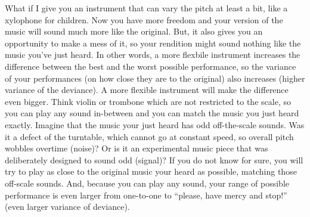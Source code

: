 \documentclass[
]{book}
\begin{document}
What if I give you an instrument that can vary the pitch at least a bit, like a xylophone for children. Now you have more freedom and your version of the music will sound much more like the original. But, it also gives you an opportunity to make a mess of it, so your rendition might sound nothing like the music you've just heard. In other words, a more flexbile instrument increases the difference between the best and the worst possible performance, so the variance of your performances (on how close they are to the original) also increases (higher variance of the deviance). A more flexible instrument will make the difference even bigger. Think violin or trombone which are not restricted to the scale, so you can play any sound in-between and you can match the music you just heard exactly. Imagine that the music your just heard has odd off-the-scale sounds. Was it a defect of the turntable, which cannot go at constant speed, so overall pitch wobbles overtime (noise)? Or is it an experimental music piece that was deliberately designed to sound odd (signal)? If you do not know for sure, you will try to play as close to the original music your heard as possible, matching those off-scale sounds. And, because you can play any sound, your range of possible performance is even larger from one-to-one to ``please, have mercy and stop!'' (even larger variance of deviance).
\end{document}
